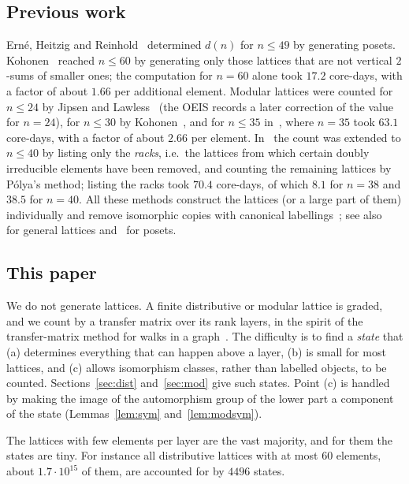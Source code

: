 \documentclass[11pt]{amsart}
\theoremstyle{definition}
\theoremstyle{remark}
\begin{document}
\subsection*{Previous work}
Ern\'e, Heitzig and Reinhold~\cite{EHR} determined $d(n)$ for $n \le 49$ by generating
posets.  Kohonen~\cite{Koh21} reached $n \le 60$ by generating only those lattices
that are not vertical $2$-sums of smaller ones; the computation for $n=60$ alone took
$17.2$ core-days, with a factor of about $1.66$ per additional element.
Modular lattices were counted for $n \le 24$ by Jipsen and Lawless~\cite{JL} (the OEIS records a later correction of the value for $n=24$), for
$n \le 30$ by Kohonen~\cite{Koh19}, and for $n \le 35$ in~\cite{Koh21}, where $n=35$
took $63.1$ core-days, with a factor of about $2.66$ per element.  In~\cite{Koh23} the
count was extended to $n \le 40$ by listing only the \emph{racks}, i.e.\ the lattices from
which certain doubly irreducible elements have been removed, and counting the remaining
lattices by P\'olya's method; listing the racks took $70.4$ core-days, of which $8.1$ for
$n = 38$ and $38.5$ for $n = 40$.  All these
methods construct the lattices (or a large part of them) individually and remove
isomorphic copies with canonical labellings~\cite{nauty}; see
also~\cite{HR,GT} for general lattices and~\cite{BM} for posets.

\subsection*{This paper}
We do not generate lattices.  A finite distributive or modular lattice is graded, and we
count by a transfer matrix over its rank layers, in the spirit of the transfer-matrix
method for walks in a graph~\cite[Section~4.7]{Stanley}.  The difficulty is to find
a \emph{state} that (a) determines everything that can happen above a layer, (b) is
small for most lattices, and (c) allows isomorphism classes, rather than labelled
objects, to be counted.  Sections~\ref{sec:dist} and~\ref{sec:mod} give such states.
Point (c) is handled by making the image of the automorphism group of the lower part
a component of the state (Lemmas~\ref{lem:sym} and~\ref{lem:modsym}).

The lattices with few elements per layer are the vast majority, and for them the states are
tiny.  For instance all distributive lattices with at most $60$ elements, about
$1.7\cdot 10^{15}$ of them, are accounted for by $4496$ states.
\end{document}
